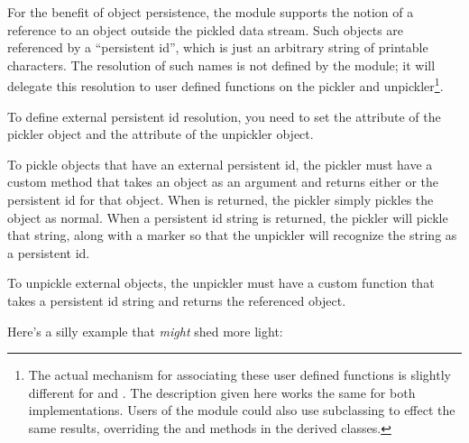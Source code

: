 For the benefit of object persistence, the  module
supports the notion of a reference to an object outside the pickled
data stream.  Such objects are referenced by a ``persistent id'',
which is just an arbitrary string of printable \ASCII{} characters.
The resolution of such names is not defined by the 
module; it will delegate this resolution to user defined functions on
the pickler and unpickler\footnote{The actual mechanism for
associating these user defined functions is slightly different for
 and .  The description given here
works the same for both implementations.  Users of the 
module could also use subclassing to effect the same results,
overriding the  and 
methods in the derived classes.}.

To define external persistent id resolution, you need to set the
 attribute of the pickler object and the
 attribute of the unpickler object.

To pickle objects that have an external persistent id, the pickler
must have a custom  method that takes an
object as an argument and returns either  or the persistent
id for that object.  When  is returned, the pickler simply
pickles the object as normal.  When a persistent id string is
returned, the pickler will pickle that string, along with a marker
so that the unpickler will recognize the string as a persistent id.

To unpickle external objects, the unpickler must have a custom
 function that takes a persistent id
string and returns the referenced object.

Here's a silly example that \emph{might} shed more light:


